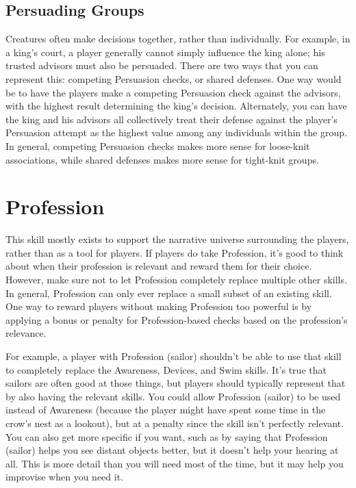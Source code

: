   \subsection{Persuading Groups}
    Creatures often make decisions together, rather than individually.
    For example, in a king's court, a player generally cannot simply influence the king alone; his trusted advisors must also be persuaded.
    There are two ways that you can represent this: competing Persuasion checks, or shared defenses.
    One way would be to have the players make a competing Persuasion check against the advisors, with the highest result determining the king's decision.
    Alternately, you can have the king and his advisors all collectively treat their defense against the player's Persuasion attempt as the highest value among any individuals within the group.
    In general, competing Persuasion checks makes more sense for loose-knit associations, while shared defenses makes more sense for tight-knit groups.

\section{Profession}
  This skill mostly exists to support the narrative universe surrounding the players, rather than as a tool for players.
  If players do take Profession, it's good to think about when their profession is relevant and reward them for their choice.
  However, make sure not to let Profession completely replace multiple other skills.
  In general, Profession can only ever replace a small subset of an existing skill.
  One way to reward players without making Profession too powerful is by applying a bonus or penalty for Profession-based checks based on the profession's relevance.

  For example, a player with Profession (sailor) shouldn't be able to use that skill to completely replace the Awareness, Devices, and Swim skills.
  It's true that sailors are often good at those things, but players should typically represent that by also having the relevant skills.
  You could allow Profession (sailor) to be used instead of Awareness (because the player might have spent some time in the crow's nest as a lookout), but at a penalty since the skill isn't perfectly relevant.
  You can also get more specific if you want, such as by saying that Profession (sailor) helps you see distant objects better, but it doesn't help your hearing at all.
  This is more detail than you will need most of the time, but it may help you improvise when you need it.

